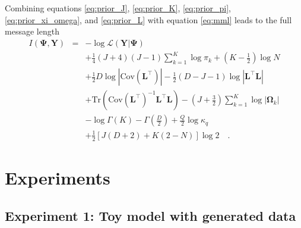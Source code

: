 \documentclass[twocolumn]{aastex62}
\newcommand{\vect}[1]{\boldsymbol{\mathbf{#1}}}
\renewcommand{\vec}[1]{\vect{#1}}
\newcommand{\weight}{\pi}
\newcommand{\data}{\textbf{Y}}
\newcommand{\transpose}{^\intercal}
\newcommand{\factorloads}{\textbf{L}}
\newcommand{\scorecovs}{\vec\Omega}
\newcommand{\NumData}{N}
\newcommand{\NumDimensions}{D}
\newcommand{\NumLatentFactors}{J}
\newcommand{\NumComponents}{K}
\newcommand{\numcomponents}{k}
\newcommand{\likelihood}{\mathcal{L}}
\begin{document}
Combining equations \ref{eq:prior_J}, \ref{eq:prior_K}, \ref{eq:prior_pi}, \ref{eq:prior_xi_omega}, and \ref{eq:prior_L} with equation \ref{eq:mml} leads to the full message length
\begin{eqnarray}
	I(\vec\Psi, \vec\data) &=& -\log\likelihood(\vec\data|\vec\Psi) \nonumber \\
	&& +\frac{1}{4}\left(\NumLatentFactors + 4\right)\left(\NumLatentFactors - 1\right)\sum_{\numcomponents=1}^\NumComponents\log\weight_\numcomponents + \left(\NumComponents - \frac{1}{2}\right)\log{\NumData} \nonumber \\
	&& +\frac{1}{2}\NumDimensions\log|\textrm{Cov}\left(\factorloads\transpose\right)| - \frac{1}{2}\left(D-J-1\right)\log|\factorloads\transpose\factorloads| \nonumber \\
	&& +\textrm{Tr}\left(\textrm{Cov}\left(\factorloads\transpose\right)^{-1}\factorloads\transpose\factorloads\right) - \left(\NumLatentFactors + \frac{3}{2}\right)\sum_{\numcomponents=1}^\NumComponents\log|\scorecovs_\numcomponents| \nonumber \\
	&& -\log\Gamma\left(\NumComponents\right) - \Gamma\left(\frac{\NumDimensions}{2}\right) + \frac{Q}{2}\log\kappa_q \nonumber \\
	&& +\frac{1}{2}\left[\NumLatentFactors(\NumDimensions + 2) + \NumComponents(2-\NumData)\right]\log{2} \quad .
\end{eqnarray}




 





\clearpage

\section{Experiments} \label{sec:experiments}




\subsection{Experiment 1: Toy model with generated data} \label{sec:experiment-toy-model}
\end{document}
